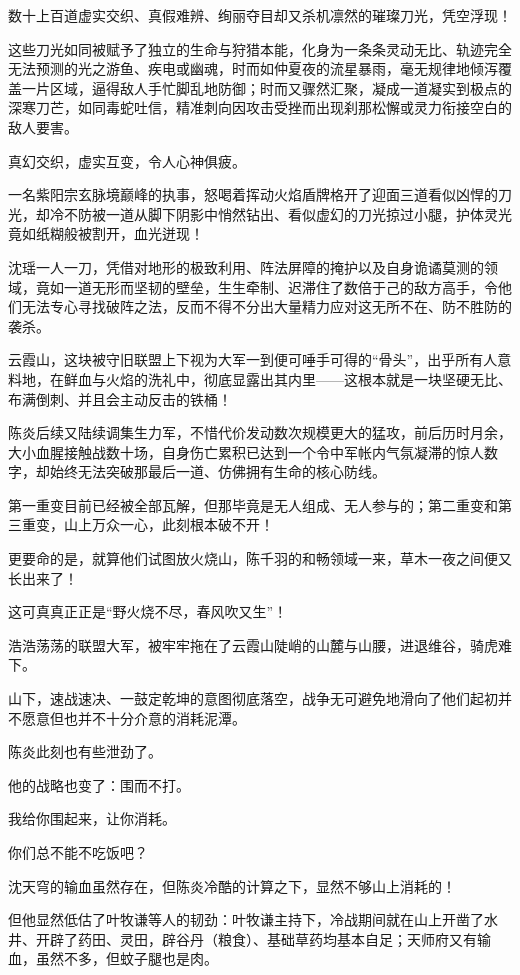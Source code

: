 数十上百道虚实交织、真假难辨、绚丽夺目却又杀机凛然的璀璨刀光，凭空浮现！

这些刀光如同被赋予了独立的生命与狩猎本能，化身为一条条灵动无比、轨迹完全无法预测的光之游鱼、疾电或幽魂，时而如仲夏夜的流星暴雨，毫无规律地倾泻覆盖一片区域，逼得敌人手忙脚乱地防御；时而又骤然汇聚，凝成一道凝实到极点的深寒刀芒，如同毒蛇吐信，精准刺向因攻击受挫而出现刹那松懈或灵力衔接空白的敌人要害。

真幻交织，虚实互变，令人心神俱疲。

一名紫阳宗玄脉境巅峰的执事，怒喝着挥动火焰盾牌格开了迎面三道看似凶悍的刀光，却冷不防被一道从脚下阴影中悄然钻出、看似虚幻的刀光掠过小腿，护体灵光竟如纸糊般被割开，血光迸现！

沈瑶一人一刀，凭借对地形的极致利用、阵法屏障的掩护以及自身诡谲莫测的领域，竟如一道无形而坚韧的壁垒，生生牵制、迟滞住了数倍于己的敌方高手，令他们无法专心寻找破阵之法，反而不得不分出大量精力应对这无所不在、防不胜防的袭杀。

云霞山，这块被守旧联盟上下视为大军一到便可唾手可得的“骨头”，出乎所有人意料地，在鲜血与火焰的洗礼中，彻底显露出其内里——这根本就是一块坚硬无比、布满倒刺、并且会主动反击的铁桶！

陈炎后续又陆续调集生力军，不惜代价发动数次规模更大的猛攻，前后历时月余，大小血腥接触战数十场，自身伤亡累积已达到一个令中军帐内气氛凝滞的惊人数字，却始终无法突破那最后一道、仿佛拥有生命的核心防线。

第一重变目前已经被全部瓦解，但那毕竟是无人组成、无人参与的；第二重变和第三重变，山上万众一心，此刻根本破不开！

更要命的是，就算他们试图放火烧山，陈千羽的和畅领域一来，草木一夜之间便又长出来了！

这可真真正正是“野火烧不尽，春风吹又生”！

浩浩荡荡的联盟大军，被牢牢拖在了云霞山陡峭的山麓与山腰，进退维谷，骑虎难下。

山下，速战速决、一鼓定乾坤的意图彻底落空，战争无可避免地滑向了他们起初并不愿意但也并不十分介意的消耗泥潭。

陈炎此刻也有些泄劲了。

他的战略也变了：围而不打。

我给你围起来，让你消耗。

你们总不能不吃饭吧？

沈天穹的输血虽然存在，但陈炎冷酷的计算之下，显然不够山上消耗的！

但他显然低估了叶牧谦等人的韧劲：叶牧谦主持下，冷战期间就在山上开凿了水井、开辟了药田、灵田，辟谷丹（粮食）、基础草药均基本自足；天师府又有输血，虽然不多，但蚊子腿也是肉。

